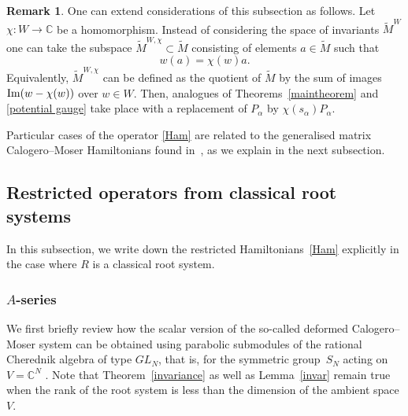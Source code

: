 \documentclass[12pt]{amsart}
\newcommand{\C}{\mathbb C}
\numberwithin{equation}{section}
\theoremstyle{definition}
\newtheorem{remark}[theorem]{Remark}
\begin{document}
\begin{remark} One can extend considerations of this subsection as follows. Let $\chi\colon W \to \mathbb C$ be a homomorphism. 
Instead of considering the space of invariants $\widetilde{M}^W$ one can take the subspace $\widetilde{M}^{W, \chi} \subset \widetilde{M}$ consisting of elements $a \in \widetilde{M}$ such that
\begin{equation*}
    w(a) = \chi(w) a.
\end{equation*}
Equivalently, $\widetilde{M}^{W, \chi}$ can be defined as the quotient of $\widetilde{M}$ by the sum of images ${\rm Im}(w - \chi(w))$ over $w \in W$. Then, analogues of Theorems~\ref{maintheorem} and \ref{potential gauge} take place with a replacement of $P_{\alpha}$ by $\chi(s_{\alpha}) P_{\alpha}$. 


\end{remark}
Particular cases of the operator \eqref{Ham} are related to the generalised matrix Calogero--Moser Hamiltonians found in~\cite{CGV}, as we explain in the next subsection. %


\subsection{Restricted operators from classical root systems}
In this subsection, we write down the restricted Hamiltonians~\eqref{Ham} explicitly in the case where $R$ is a classical root system. 

\subsubsection{$A$-series} \label{rat type A}
 
We first briefly review how the scalar version of the so-called deformed Calogero--Moser system can be obtained using parabolic submodules of the rational Cherednik algebra of type $GL_N$, that is, for the symmetric group~$S_N$ acting on $V = \C^N$ \cite{Feigin}. Note that Theorem~\ref{invariance} as well as Lemma~\ref{invar} remain true when the rank of the root system is less than the dimension of the ambient space $V$. 
\end{document}
